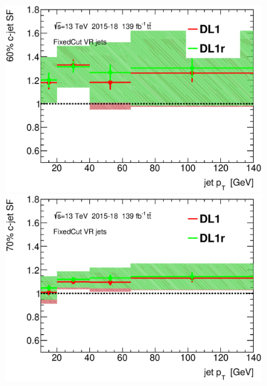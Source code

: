 \documentclass[letterpaper,12pt]{article}
\begin{document}
\begin{figure}[H]
\begin{minipage}[b]{.45\textwidth}
\centering
\includegraphics[width=1\textwidth]{SFplots_december/DL1allVRJetsDec_DL1rallVRJetsDec/SF60.eps}
\end{minipage}\hfill
\begin{minipage}[b]{.45\textwidth}
\centering
\includegraphics[width=1\textwidth]{SFplots_december/DL1allVRJetsDec_DL1rallVRJetsDec/SF70.eps}
\end{minipage}\hfill
\begin{minipage}[b]{.45\textwidth}
\centering

\end{minipage}
\end{figure}
\end{document}
